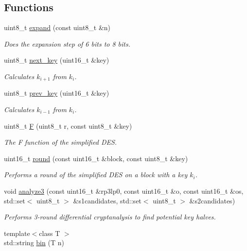 \subsection*{Functions}
\begin{DoxyCompactItemize}
\item 
uint8\+\_\+t \hyperlink{namespacedes4_1_1__internal_acd9fc768f9ac5e99f543f6771ea1d8d0}{expand} (const uint8\+\_\+t \&n)
\begin{DoxyCompactList}\small\item\em Does the expansion step of 6 bits to 8 bits. \end{DoxyCompactList}\item 
uint8\+\_\+t \hyperlink{namespacedes4_1_1__internal_ae9874e0862d7ac6509b7c73d0b45be6a}{next\+\_\+key} (uint16\+\_\+t \&key)
\begin{DoxyCompactList}\small\item\em Calculates $ k_{i+1} $ from $ k_i $. \end{DoxyCompactList}\item 
uint8\+\_\+t \hyperlink{namespacedes4_1_1__internal_ad52b0b2cece70a13f93c2b97268f4273}{prev\+\_\+key} (uint16\+\_\+t \&key)
\begin{DoxyCompactList}\small\item\em Calculates $ k_{i-1} $ from $ k_i $. \end{DoxyCompactList}\item 
uint8\+\_\+t \hyperlink{namespacedes4_1_1__internal_ae8077cc28b6910a45f48aa3e08c71fdd}{F} (uint8\+\_\+t r, const uint8\+\_\+t \&key)
\begin{DoxyCompactList}\small\item\em The F function of the simplified D\+ES. \end{DoxyCompactList}\item 
uint16\+\_\+t \hyperlink{namespacedes4_1_1__internal_a81f41682b02b5ce6dab70ed2e3112de1}{round} (const uint16\+\_\+t \&block, const uint8\+\_\+t \&key)
\begin{DoxyCompactList}\small\item\em Performs a round of the simplified D\+ES on a block with a key $ k_i $. \end{DoxyCompactList}\item 
void \hyperlink{namespacedes4_1_1__internal_abee6b424b2e737d7517423a278a0f2de}{analyze3} (const uint16\+\_\+t \&rp3lp0, const uint16\+\_\+t \&o, const uint16\+\_\+t \&os, std\+::set$<$ uint8\+\_\+t $>$ \&s1candidates, std\+::set$<$ uint8\+\_\+t $>$ \&s2candidates)
\begin{DoxyCompactList}\small\item\em Performs 3-\/round differential cryptanalysis to find potential key halves. \end{DoxyCompactList}\item 
{\footnotesize template$<$class T $>$ }\\std\+::string \hyperlink{namespacedes4_1_1__internal_a052c188f1f5a87e501537c057a642a0f}{bin} (T n)
\end{DoxyCompactItemize}
